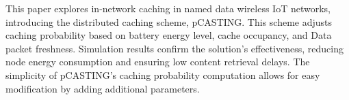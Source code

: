 \documentclass[conference]{IEEEtran}
\begin{document}
This paper explores in-network caching in named data wireless IoT networks, introducing the distributed caching scheme, pCASTING. 
This scheme adjusts caching probability based on battery energy level, cache occupancy, and Data packet freshness. Simulation results 
confirm the solution's effectiveness, reducing node energy consumption and ensuring low content retrieval delays. The simplicity of pCASTING's 
caching probability computation allows for easy modification by adding additional parameters.




\end{document}
